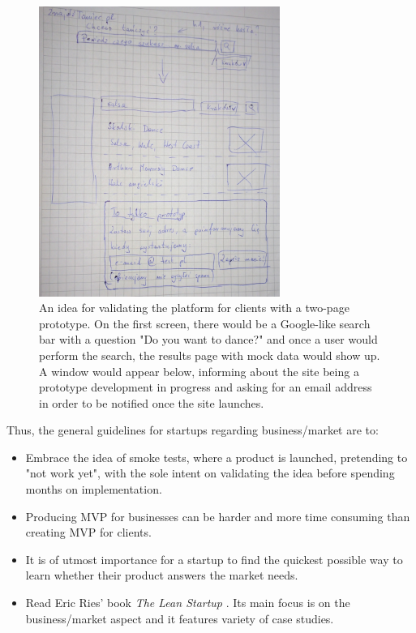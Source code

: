 \documentclass{article}
\begin{document}
\begin{figure}[h]
    \centering
    \includegraphics[width=0.7\textwidth]{znajdz-taniec}
    \caption{An idea for validating the platform for clients with a two-page prototype. On the first screen, there would be a Google-like search bar with a question "Do you want to dance?" and once a user would perform the search, the results page with mock data would show up. A window would appear below, informing about the site being a prototype development in progress and asking for an email address in order to be notified once the site launches.}
    \label{fig:znajdz-taniec} 
\end{figure}

Thus, the general guidelines for startups regarding business/market are to:
\begin{itemize}
\item Embrace the idea of smoke tests, where a product is launched, pretending to "not work yet", with the sole intent on validating the idea before spending months on implementation.
\item Producing MVP for businesses can be harder and more time consuming than creating MVP for clients.
\item It is of utmost importance for a startup to find the quickest possible way to learn whether their product answers the market needs.
\item Read Eric Ries' book \textit{The Lean Startup} \citep{ries2011lean}. Its main focus is on the business/market aspect and it features variety of case studies.
\end{itemize}
\end{document}
